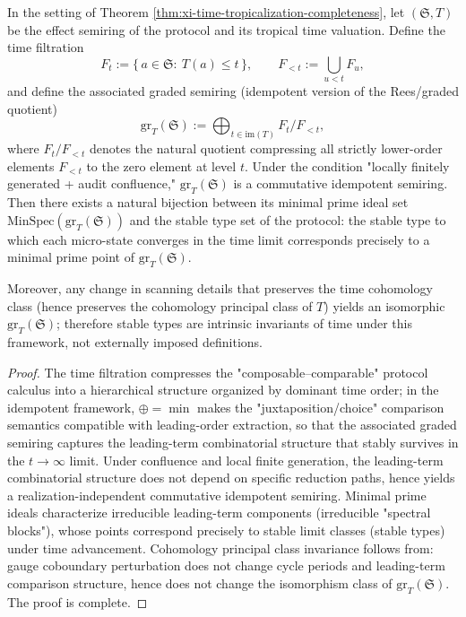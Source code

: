 \begin{theorem}\label{thm:xi-stable-type-minspec-graded-semiring}
In the setting of Theorem \ref{thm:xi-time-tropicalization-completeness}, let \((\mathfrak S,T)\) be the effect semiring of the protocol and its tropical time valuation.
Define the time filtration
\[
F_t:=\{\,a\in\mathfrak S:\ T(a)\le t\,\},
\qquad
F_{<t}:=\bigcup_{u<t}F_u,
\]
and define the associated graded semiring (idempotent version of the Rees/graded quotient)
\[
\mathrm{gr}_T(\mathfrak S):=\bigoplus_{t\in\mathrm{im}(T)} F_t/F_{<t},
\]
where \(F_t/F_{<t}\) denotes the natural quotient compressing all strictly lower-order elements \(F_{<t}\) to the zero element at level \(t\).
Under the condition "locally finitely generated + audit confluence," \(\mathrm{gr}_T(\mathfrak S)\) is a commutative idempotent semiring.
Then there exists a natural bijection between its minimal prime ideal set \(\mathrm{MinSpec}(\mathrm{gr}_T(\mathfrak S))\) and the stable type set of the protocol: the stable type to which each micro-state converges in the time limit corresponds precisely to a minimal prime point of \(\mathrm{gr}_T(\mathfrak S)\).
\par
Moreover, any change in scanning details that preserves the time cohomology class (hence preserves the cohomology principal class of \(T\)) yields an isomorphic \(\mathrm{gr}_T(\mathfrak S)\);
therefore stable types are intrinsic invariants of time under this framework, not externally imposed definitions.
\end{theorem}
\begin{proof}
The time filtration compresses the "composable--comparable" protocol calculus into a hierarchical structure organized by dominant time order; in the idempotent framework, \(\oplus=\min\) makes the "juxtaposition/choice" comparison semantics compatible with leading-order extraction, so that the associated graded semiring captures the leading-term combinatorial structure that stably survives in the \(t\to\infty\) limit.
Under confluence and local finite generation, the leading-term combinatorial structure does not depend on specific reduction paths, hence yields a realization-independent commutative idempotent semiring.
Minimal prime ideals characterize irreducible leading-term components (irreducible "spectral blocks"), whose points correspond precisely to stable limit classes (stable types) under time advancement.
Cohomology principal class invariance follows from: gauge coboundary perturbation does not change cycle periods and leading-term comparison structure, hence does not change the isomorphism class of \(\mathrm{gr}_T(\mathfrak S)\). The proof is complete.
\end{proof}


